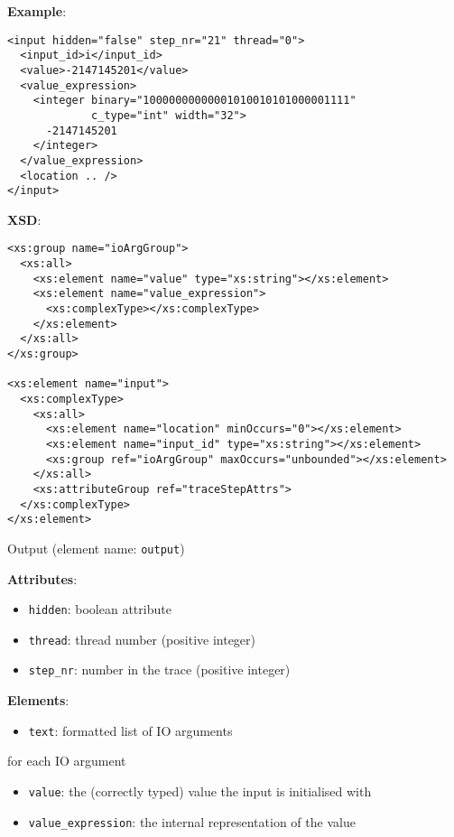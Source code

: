 \documentclass[12pt]{article}
\begin{document}
\noindent\textbf{Example}:
\begin{verbatim}
<input hidden="false" step_nr="21" thread="0">
  <input_id>i</input_id>
  <value>-2147145201</value>
  <value_expression>
    <integer binary="10000000000001010010101000001111"
             c_type="int" width="32">
      -2147145201
    </integer>
  </value_expression>
  <location .. />
</input>
\end{verbatim}

\noindent\textbf{XSD}:
\begin{verbatim}
<xs:group name="ioArgGroup">
  <xs:all>
    <xs:element name="value" type="xs:string"></xs:element>
    <xs:element name="value_expression">
      <xs:complexType></xs:complexType>
    </xs:element>
  </xs:all>
</xs:group>

<xs:element name="input">
  <xs:complexType>
    <xs:all>
      <xs:element name="location" minOccurs="0"></xs:element>
      <xs:element name="input_id" type="xs:string"></xs:element>
      <xs:group ref="ioArgGroup" maxOccurs="unbounded"></xs:element>
    </xs:all>
    <xs:attributeGroup ref="traceStepAttrs">
  </xs:complexType>
</xs:element>
\end{verbatim}

\hrulefill

\begin{center}
  {\Large Output} (element name: \texttt{output})
\end{center}

\noindent\textbf{Attributes}:
\begin{itemize}
\item \texttt{hidden}: boolean attribute
\item \texttt{thread}: thread number (positive integer)
\item \texttt{step\_nr}: number in the trace (positive integer)
\end{itemize}

\noindent\textbf{Elements}:
\begin{itemize}
\item \texttt{text}: formatted list of IO arguments
\end{itemize}
for each IO argument
\begin{itemize}
\item \texttt{value}: the (correctly typed) value the input is initialised with
\item \texttt{value\_expression}: the internal representation of the value
\end{itemize}
\end{document}
